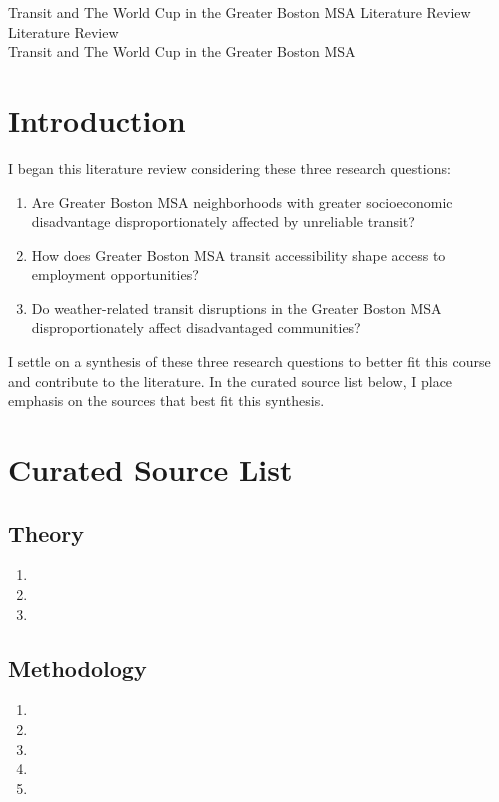 \documentclass[12pt]{article}
\def\assignment{Literature Review}
\def\byline{Transit and The World Cup in the Greater Boston MSA}
\begin{document}
\begingroup
\centering
\ifx\byline\empty
\LARGE\assignment\\
\else\LARGE\assignment\\\large\byline\\[1.5em]
\fi
\endgroup
\section{Introduction}
I began this literature review considering these three research questions:
\begin{enumerate}
    \item Are Greater Boston MSA neighborhoods with greater socioeconomic disadvantage disproportionately affected by unreliable transit?
    \item How does Greater Boston MSA transit accessibility shape access to employment opportunities?
    \item Do weather-related transit disruptions in the Greater Boston MSA disproportionately affect disadvantaged communities?
\end{enumerate}
I settle on a synthesis of these three research questions to better fit this course and contribute to the literature.
In the curated source list below, I place emphasis on the sources that best fit this synthesis.
\section{Curated Source List}
\subsection{Theory}
\begin{enumerate}
    \item {}
    \item {}
    \item {}
\end{enumerate}
\subsection{Methodology}
\begin{enumerate}
    \item {}
    \item {}
    \item {}
    \item {}
    \item {}
\end{enumerate}
\end{document}
